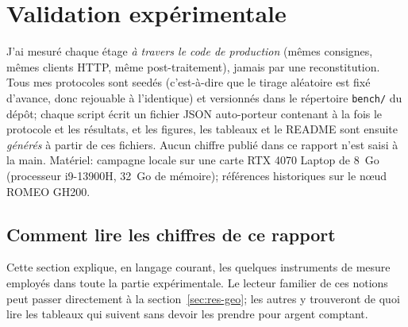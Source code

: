 \documentclass[11pt,a4paper]{article}
\begin{document}
\section{Validation expérimentale}
\label{sec:validation}

\begin{objbox}
J'ai mesuré chaque étage \emph{à travers le code de production} (mêmes consignes, mêmes clients HTTP, même post-traitement), jamais par une reconstitution. Tous mes protocoles sont seedés (c'est-à-dire que le tirage aléatoire est fixé d'avance, donc rejouable à l'identique) et versionnés dans le répertoire \texttt{bench/} du dépôt; chaque script écrit un fichier JSON auto-porteur contenant à la fois le protocole et les résultats, et les figures, les tableaux et le README sont ensuite \emph{générés} à partir de ces fichiers. Aucun chiffre publié dans ce rapport n'est saisi à la main. Matériel: campagne locale sur une carte RTX 4070 Laptop de 8~Go (processeur i9-13900H, 32~Go de mémoire); références historiques sur le n\oe ud ROMEO GH200. 
\end{objbox}

\subsection{Comment lire les chiffres de ce rapport}
\label{sec:lire-chiffres}

Cette section explique, en langage courant, les quelques instruments de mesure employés dans toute la partie expérimentale. Le lecteur familier de ces notions peut passer directement à la section~\ref{sec:res-geo}; les autres y trouveront de quoi lire les tableaux qui suivent sans devoir les prendre pour argent comptant.
\end{document}

